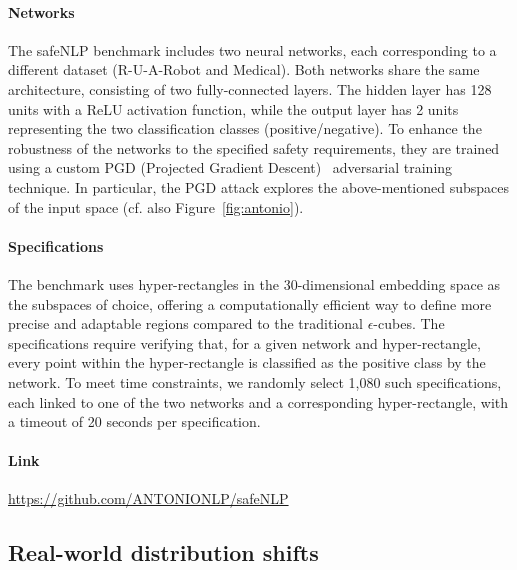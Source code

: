 \documentclass[oneside,11pt,dvipsnames]{book}
\begin{document}
\paragraph*{Networks} The safeNLP benchmark includes two neural networks, each corresponding to a different dataset (R-U-A-Robot and Medical). Both networks share the same architecture, consisting of two fully-connected layers. The hidden layer has 128 units with a ReLU activation function, while the output layer has 2 units representing the two classification classes (positive/negative). To enhance the robustness of the networks to the specified safety requirements, they are trained using a custom PGD (Projected Gradient Descent)~\cite{madry2018towards} adversarial training technique. In particular, the PGD attack explores the above-mentioned subspaces of the input space (cf. also Figure~\ref{fig:antonio}). 

\paragraph*{Specifications} The benchmark uses hyper-rectangles in the 30-dimensional embedding space as the subspaces of choice, offering a computationally efficient way to define more precise and adaptable regions compared to the traditional $\epsilon$-cubes. 
The specifications require verifying that, for a given network and hyper-rectangle, every point within the hyper-rectangle is classified as the positive class by the network. To meet time constraints, we randomly select 1,080 such specifications, each linked to one of the two networks and a corresponding hyper-rectangle, with a timeout of 20 seconds per specification.

\paragraph*{Link} \url{https://github.com/ANTONIONLP/safeNLP}


\subsection{Real-world distribution shifts}
\end{document}
